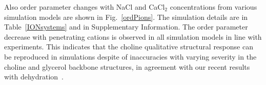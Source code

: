 \documentclass[pre,aps,floatfix,authordate1-4,twocolumn]{revtex4-1}
\begin{document}
Also order parameter changes with NaCl and CaCl$_2$ concentrations from various simulation models are shown in Fig.~\ref{ordPions}. 
The simulation details are in Table~\ref{IONsystems} and in Supplementary Information. 
The order parameter decrease with penetrating cations is observed in all simulation models in line with experiments.
This indicates that the choline qualitative structural response can be reproduced in simulations despite of 
inaccuracies with varying severity in the choline and glycerol backbone structures, in agreement
with our recent results with dehydration~\cite{botan15}.

\end{document}
